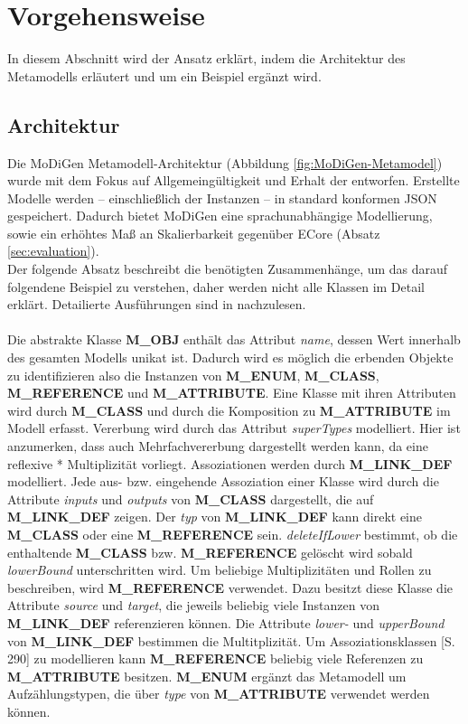 \section{Vorgehensweise}
In diesem Abschnitt wird der Ansatz erkl\"art, indem die Architektur des Metamodells erl\"autert und um ein Beispiel erg\"anzt wird.

\subsection{Architektur}
Die MoDiGen Metamodell-Architektur (Abbildung \ref{fig:MoDiGen-Metamodel}) wurde mit dem Fokus auf Allgemeingültigkeit und Erhalt der  entworfen. Erstellte Modelle werden -- einschließlich der Instanzen -- in standard konformen JSON gespeichert. Dadurch bietet MoDiGen eine sprachunabhängige Modellierung, sowie ein erhöhtes Maß an Skalierbarkeit gegenüber ECore (Absatz \ref{sec:evaluation}).\\Der folgende Absatz beschreibt die benötigten Zusammenhänge, um das darauf folgendene Beispiel zu verstehen, daher werden nicht alle Klassen im Detail erkl\"art. Detailierte Ausführungen sind in \cite{gerhart2015approach} nachzulesen.\\\\



Die abstrakte Klasse \textbf{M\_OBJ} enth\"alt das Attribut \textit{name}, dessen Wert innerhalb des gesamten Modells unikat ist. Dadurch wird es m\"oglich die erbenden Objekte zu identifizieren also die Instanzen von \textbf{M\_ENUM}, \textbf{M\_CLASS}, \textbf{M\_REFERENCE} und \textbf{M\_ATTRIBUTE}.
Eine Klasse mit ihren Attributen wird durch \textbf{M\_CLASS} und durch die Komposition zu \textbf{M\_ATTRIBUTE} im Modell erfasst. Vererbung wird durch das Attribut \textit{superTypes} modelliert. Hier ist anzumerken, dass auch Mehrfachvererbung dargestellt werden kann, da eine reflexive * Multiplizität vorliegt. 
Assoziationen werden durch \textbf{M\_LINK\_DEF} modelliert. Jede aus- bzw. eingehende Assoziation einer Klasse wird durch die Attribute \textit{inputs} und \textit{outputs} von \textbf{M\_CLASS} dargestellt, die auf \textbf{M\_LINK\_DEF} zeigen. Der \textit{typ} von \textbf{M\_LINK\_DEF} kann direkt eine \textbf{M\_CLASS} oder eine \textbf{M\_REFERENCE} sein. \textit{deleteIfLower} bestimmt, ob die enthaltende \textbf{M\_CLASS} bzw. \textbf{M\_REFERENCE} gel\"oscht wird sobald \textit{lowerBound} unterschritten wird. Um beliebige Multiplizitäten und Rollen zu beschreiben, wird \textbf{M\_REFERENCE} verwendet. Dazu besitzt diese Klasse die Attribute \textit{source} und \textit{target}, die jeweils beliebig viele Instanzen von \textbf{M\_LINK\_DEF} referenzieren können. Die Attribute \textit{lower-} und \textit{upperBound} von \textbf{M\_LINK\_DEF} bestimmen die Multitplizität. Um Assoziationsklassen \cite{larman2005book}[S. 290] zu modellieren kann \textbf{M\_REF\-ER\-ENCE} beliebig viele Referenzen zu \textbf{M\_ATTRIBUTE} besitzen. \textbf{M\_ENUM} erg\"anzt das Metamodell um Aufz\"ahlungstypen, die \"uber \textit{type} von \textbf{M\_ATTRIBUTE} verwendet werden k\"onnen.

